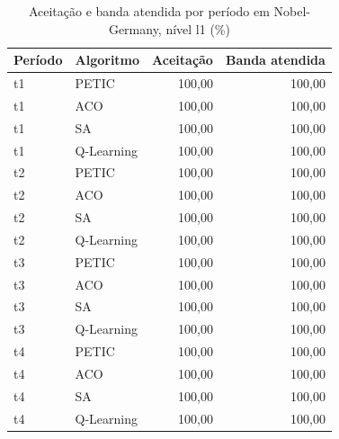 \begin{table}[htb]
    \centering
    \scriptsize
    \caption{Aceitação e banda atendida por período em Nobel-Germany, nível l1 (\%)}
    \label{tab:periodos-nobel-germany-l1}
    \begin{tabular}{llrr}
        \hline
        Período & Algoritmo & Aceitação & Banda atendida \\
        \hline
        t1 & PETIC & 100,00 & 100,00 \\
        t1 & ACO & 100,00 & 100,00 \\
        t1 & SA & 100,00 & 100,00 \\
        t1 & Q-Learning & 100,00 & 100,00 \\
        t2 & PETIC & 100,00 & 100,00 \\
        t2 & ACO & 100,00 & 100,00 \\
        t2 & SA & 100,00 & 100,00 \\
        t2 & Q-Learning & 100,00 & 100,00 \\
        t3 & PETIC & 100,00 & 100,00 \\
        t3 & ACO & 100,00 & 100,00 \\
        t3 & SA & 100,00 & 100,00 \\
        t3 & Q-Learning & 100,00 & 100,00 \\
        t4 & PETIC & 100,00 & 100,00 \\
        t4 & ACO & 100,00 & 100,00 \\
        t4 & SA & 100,00 & 100,00 \\
        t4 & Q-Learning & 100,00 & 100,00 \\
        \hline
    \end{tabular}
\end{table}

